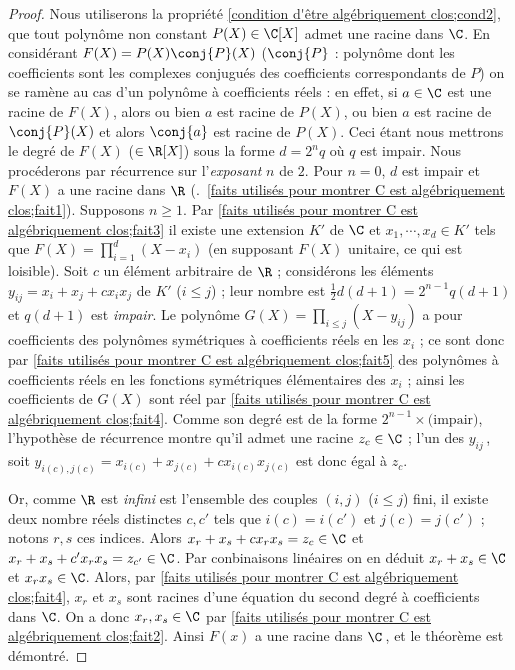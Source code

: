 \documentclass[11pt, %
  title in boldface,
  theorem in new line,
  theorem numbering = section,
  number theorems separately,
  simple name,
]{beaulivre}
\begin{document}
    \begin{proof}
        Nous utiliserons la propriété \ref{condition d'être algébriquement clos;cond2}, que tout polynôme non constant \( P(X) \in \C[X] \) admet une racine dans \( \C \). En considérant \( F(X) = P(X) \conj{P}(X) \) (\( \conj{P} \) : polynôme dont les coefficients sont les complexes conjugués des coefficients correspondants de \( P \)) on se ramène au cas d'un polynôme à coefficients réels : en effet, si \( a \in \C \) est une racine de \( F(X) \), alors ou bien \( a \) est racine de \( P(X) \), ou bien \( a \) est racine de \( \conj{P}(X) \) et alors \( \conj{a} \) est racine de \( P(X) \). Ceci étant nous mettrons le degré de \( F(X) \) (\( \in \R[X] \)) sous la forme \( d = 2^n q \) où \( q \) est impair. Nous procéderons par récurrence sur l'\emph{exposant} \( n \) de \( 2 \). Pour \( n = 0 \), \( d \) est impair et \( F(X) \) a une racine dans \( \R \) (\cf.~\ref{faits utilisés pour montrer C est algébriquement clos;fait1}). Supposons \( n \geqslant 1 \). Par \ref{faits utilisés pour montrer C est algébriquement clos;fait3} il existe une extension \( K' \) de \( \C \) et \( x_1, \cdots, x_d \in K' \) tels que \( F(X) = \prod_{i=1}^d (X-x_i) \) (en supposant \( F(X) \) unitaire, ce qui est loisible). Soit \( c \) un élément arbitraire de \( \R \) ; considérons les éléments \( y_{ij} = x_i + x_j + c x_i x_j \) de \( K' \) (\( i \leqslant j \)) ; leur nombre est \( \frac{1}{2} d(d+1) = 2^{n-1} q (d+1) \) et \( q(d+1) \) est \emph{impair}. Le polynôme \( G(X) = \prod_{i \leqslant j} (X-y_{ij}) \) a pour coefficients des polynômes symétriques à coefficients réels en les \( x_i \) ; ce sont donc par \ref{faits utilisés pour montrer C est algébriquement clos;fait5} des polynômes à coefficients réels en les fonctions symétriques élémentaires des \( x_i \) ; ainsi les coefficients de \( G(X) \) sont réel par \ref{faits utilisés pour montrer C est algébriquement clos;fait4}. Comme son degré est de la forme \( 2^{n-1} \times \text{(impair)} \), l'hypothèse de récurrence montre qu'il admet une racine \( z_c \in \C \) ; l'un des \( y_{ij} \)\,, soit \( y_{i(c),j(c)} = x_{i(c)} + x_{j(c)} + c x_{i(c)} x_{j(c)} \) est donc égal à \( z_c \).

        Or, comme \( \R \) est \emph{infini} est l'ensemble des couples \( (i,j) \) (\( i \leqslant j \)) fini, il existe deux nombre réels distinctes \( c, c' \) tels que \( i(c) = i(c') \) et \( j(c) = j(c') \) ; notons \( r,s \) ces indices. Alors \( x_r + x_s + c x_r x_s = z_c \in \C \) et \( x_r + x_s + c' x_r x_s = z_{c'} \in \C \). Par conbinaisons linéaires on en déduit \( x_r + x_s \in \C \) et \( x_r x_s \in \C \). Alors, par \ref{faits utilisés pour montrer C est algébriquement clos;fait4}, \( x_r \) et \( x_s \) sont racines d'une équation du second degré à coefficients dans \( \C \). On a donc \( x_r, x_s \in \C \) par \ref{faits utilisés pour montrer C est algébriquement clos;fait2}. Ainsi \( F(x) \) a une racine dans \( \C \)\,, et le théorème est démontré.
    \end{proof}
\end{document}
